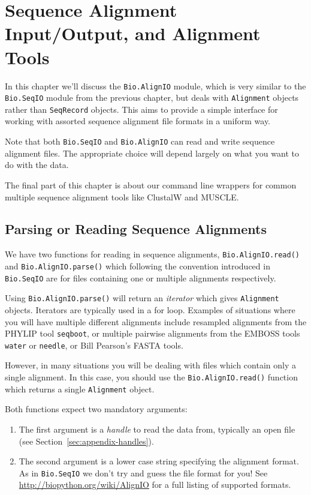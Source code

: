 \documentclass{report}
\begin{document}
\chapter{Sequence Alignment Input/Output, and Alignment Tools}
\label{chapter:Bio.AlignIO}

In this chapter we'll discuss the \verb|Bio.AlignIO| module, which is very similar to the \verb|Bio.SeqIO| module from the previous chapter, but deals with \verb|Alignment| objects rather than \verb|SeqRecord| objects. 
This aims to provide a simple interface for working with assorted sequence alignment file formats in a uniform way.

Note that both \verb|Bio.SeqIO| and \verb|Bio.AlignIO| can read and write sequence alignment files.  The appropriate choice will depend largely on what you want to do with the data.

The final part of this chapter is about our command line wrappers for common multiple sequence alignment tools like ClustalW and MUSCLE.

\section{Parsing or Reading Sequence Alignments}

We have two functions for reading in sequence alignments, \verb|Bio.AlignIO.read()| and \verb|Bio.AlignIO.parse()| which following the convention introduced in \verb|Bio.SeqIO| are for files containing one or multiple alignments respectively.

Using \verb|Bio.AlignIO.parse()| will return an {\it iterator} which gives \verb|Alignment| objects.  Iterators are typically used in a for loop.  Examples of situations where you will have multiple different alignments include resampled alignments from the PHYLIP tool \verb|seqboot|, or multiple pairwise alignments from the EMBOSS tools \verb|water| or \verb|needle|, or Bill Pearson's FASTA tools.

However, in many situations you will be dealing with files which contain only a single alignment.  In this case, you should use the \verb|Bio.AlignIO.read()| function which returns a single \verb|Alignment| object.

Both functions expect two mandatory arguments:

\begin{enumerate}
\item The first argument is a {\it handle} to read the data from, typically an open file (see Section~\ref{sec:appendix-handles}).
\item The second argument is a lower case string specifying the alignment format.  As in \verb|Bio.SeqIO| we don't try and guess the file format for you!  See \url{http://biopython.org/wiki/AlignIO} for a full listing of supported formats.
\end{enumerate}
\end{document}

